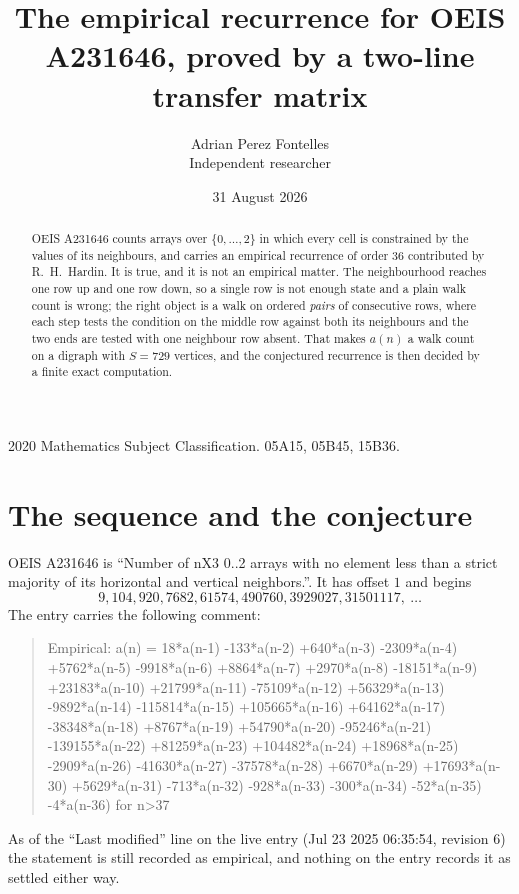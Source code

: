 \documentclass[11pt,a4paper]{article}
\title{The empirical recurrence for OEIS A231646, proved by a two-line transfer matrix}
\author{Adrian Perez Fontelles\\ \small Independent researcher}
\date{31 August 2026}
\theoremstyle{plain}
\theoremstyle{definition}
\begin{document}
\maketitle

\begin{abstract}
OEIS A231646 counts arrays over $\{0,\dots,2\}$ in which every cell is constrained by the
values of its neighbours, and carries an empirical recurrence of order $36$ contributed
by R.~H.~Hardin. It is true, and it is not an empirical matter. The neighbourhood reaches one
row up and one row down, so a single row is not enough state and a plain walk count
is wrong; the right object is a walk on ordered \emph{pairs} of consecutive rows, where
each step tests the condition on the middle row against both its neighbours and the two
ends are tested with one neighbour row absent. That makes $a(n)$ a walk count on a digraph
with $S=729$ vertices, and the conjectured recurrence is then decided by a finite exact
computation.
\end{abstract}

\noindent\small 2020 Mathematics Subject Classification. 05A15, 05B45, 15B36.\normalsize

\section{The sequence and the conjecture}

OEIS A231646 is ``Number of nX3 0..2 arrays with no element less than a strict majority of its horizontal and vertical neighbors.''. It has offset $1$ and begins
\[
9, 104, 920, 7682, 61574, 490760, 3929027, 31501117,\ \dots
\]
The entry carries the following comment:
\begin{quote}\small
Empirical: a(n) = 18*a(n-1) -133*a(n-2) +640*a(n-3) -2309*a(n-4) +5762*a(n-5) -9918*a(n-6) +8864*a(n-7) +2970*a(n-8) -18151*a(n-9) +23183*a(n-10) +21799*a(n-11) -75109*a(n-12) +56329*a(n-13) -9892*a(n-14) -115814*a(n-15) +105665*a(n-16) +64162*a(n-17) -38348*a(n-18) +8767*a(n-19) +54790*a(n-20) -95246*a(n-21) -139155*a(n-22) +81259*a(n-23) +104482*a(n-24) +18968*a(n-25) -2909*a(n-26) -41630*a(n-27) -37578*a(n-28) +6670*a(n-29) +17693*a(n-30) +5629*a(n-31) -713*a(n-32) -928*a(n-33) -300*a(n-34) -52*a(n-35) -4*a(n-36) for n>37
\end{quote}
As of the ``Last modified'' line on the live entry (Jul 23 2025 06:35:54, revision 6) the statement is
still recorded as empirical, and nothing on the entry records it as settled either way.
\end{document}
